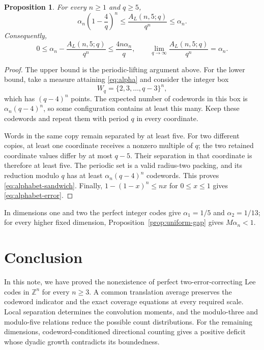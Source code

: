 \documentclass[12pt,letterpaper,onecolumn]{article}
\newtheorem{proposition}[theorem]{Proposition}
\theoremstyle{definition}
\newcommand{\Z}{\mathbb{Z}}
\begin{document}
\begin{proposition}\label{prop:alphabet-limit}
For every $n\ge1$ and $q\ge5$,
\begin{equation}\label{eq:alphabet-sandwich}
 \alpha_n\left(1-\frac4q\right)^n
 \le\frac{A_L(n,5;q)}{q^n}\le\alpha_n.
\end{equation}
Consequently,
\begin{equation}\label{eq:alphabet-error}
 0\le\alpha_n-\frac{A_L(n,5;q)}{q^n}
 \le\frac{4n\alpha_n}{q},\qquad
 \lim_{q\to\infty}\frac{A_L(n,5;q)}{q^n}=\alpha_n.
\end{equation}
\end{proposition}
\begin{proof}
The upper bound is the periodic-lifting argument above. For the lower bound, take a measure attaining \eqref{eq:alpha} and consider the integer box
\[
 W_q=\{2,3,\ldots,q-3\}^n,
\]
which has $(q-4)^n$ points. The expected number of codewords in this box is $\alpha_n(q-4)^n$, so some configuration contains at least this many. Keep these codewords and repeat them with period $q$ in every coordinate.

Words in the same copy remain separated by at least five. For two different copies, at least one coordinate receives a nonzero multiple of $q$; the two retained coordinate values differ by at most $q-5$. Their separation in that coordinate is therefore at least five. The periodic set is a valid radius-two packing, and its reduction modulo $q$ has at least $\alpha_n(q-4)^n$ codewords. This proves \eqref{eq:alphabet-sandwich}. Finally, $1-(1-x)^n\le nx$ for $0\le x\le1$ gives \eqref{eq:alphabet-error}.
\end{proof}

In dimensions one and two the perfect integer codes give $\alpha_1=1/5$ and $\alpha_2=1/13$; for every higher fixed dimension, Proposition~\ref{prop:uniform-gap} gives $M\alpha_n<1$.

 \section{Conclusion}\label{sec:conclusion}
In this note, we have proved the nonexistence of perfect two-error-correcting Lee codes in $\Z^n$ for every $n\ge3$. A common translation average preserves the codeword indicator and the exact coverage equations at every required scale. Local separation determines the convolution moments, and the modulo-three and modulo-five relations reduce the possible count distributions. For the remaining dimensions, codeword-conditioned directional counting gives a positive deficit whose dyadic growth contradicts its boundedness.
\end{document}
